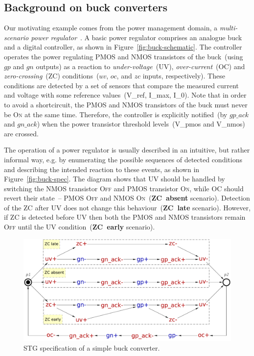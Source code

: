 \documentclass[british, journal]{IEEEtran}
\newcommand{\noun}[1]{\textsc{#1}}
\begin{document}
\subsection{Background on buck converters\label{sub:buck}}

Our motivating example comes from the power management domain, a
\emph{multi-scenario power regulator}~\cite{2014_sokolov_ftfc}.
A basic power regulator comprises an analogue buck and a digital controller,
as shown in Figure~\ref{fig:buck-schematic}. The controller operates
the power regulating PMOS and NMOS transistors of the buck~(using \textsf{$gp$}
and \textsf{$gn$} outputs) as a reaction to \emph{under-voltage}~(UV),
\emph{over-current}~(OC) and \emph{zero-crossing}~(ZC)
conditions~(\textsf{$uv$},
\textsf{$oc$}, and \textsf{$zc$} inputs, respectively). These conditions
are detected by a set of sensors that compare the measured current and voltage
with some reference values~(\textsf{V\_ref}, \textsf{I\_max}, \textsf{I\_0}).
Note that in order to avoid a shortcircuit, the PMOS and NMOS transistors of
the buck must never be \noun{On} at the same time. Therefore, the controller
is explicitly notified~(by \textsf{$gp\_ack$} and \textsf{$gn\_ack$})
when the power transistor threshold levels~(\textsf{V\_pmos} and
\textsf{V\_nmos})
are crossed.

The operation of a power regulator is usually described in an intuitive,
but rather informal way, e.g. by enumerating the possible sequences
of detected conditions and describing the intended reaction to these
events, as shown in Figure~\ref{fig:buck-spec}. The diagram shows
that UV should be handled by switching the NMOS transistor \noun{Off}
and PMOS transistor \noun{On}, while OC should revert their state~--
PMOS \noun{Off} and NMOS \noun{On}~(\textbf{ZC~absent} scenario). Detection of
the ZC after UV does not change this behaviour~(\textbf{ZC~late} scenario).
However, if ZC is detected before UV then both the PMOS and NMOS transistors
remain \noun{Off} until the UV condition~(\textbf{ZC~early} scenario).

\begin{figure}[t]
\begin{centering}
\includegraphics[scale=0.23]{Images/stg-buck}
\par
\protect\caption{\label{fig:Monolithic-buck}STG specification of a simple buck
converter.}
\par\end{centering}
\end{figure}
\end{document}
